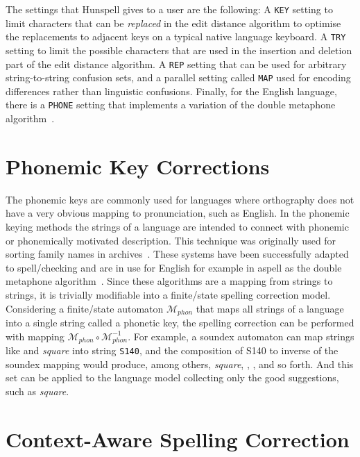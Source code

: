 \documentclass[officiallayout,final]{unihelcompling}
\newcommand\misspelt{\bgroup\markoverwith
{\textcolor{red}{\lower3.5pt\hbox{\sixly \char58}}}\ULon}
\begin{document}
The settings that Hunspell gives to a user are the following: A \texttt{KEY}
setting to limit characters that can be \emph{replaced} in the edit distance
algorithm to optimise the replacements to adjacent keys on a typical native
language keyboard. A \texttt{TRY} setting to limit the possible characters
that are used in the insertion and deletion part of the edit distance
algorithm. A \texttt{REP} setting that can be used for arbitrary
string-to-string confusion sets, and a parallel setting called \texttt{MAP}
used for encoding differences rather than linguistic confusions.  Finally, for
the English language, there is a \texttt{PHONE} setting that implements a
variation of the double metaphone algorithm~\citep{philips2000double}.

\section{Phonemic Key Corrections}
\label{sec:phonemic}

The phonemic keys are commonly used for languages where orthography does not
have a very obvious mapping to pronunciation, such as English. In the phonemic
keying methods the strings of a language are intended to connect with phonemic
or phonemically motivated description. This technique was originally used for
sorting family names in archives~\citep{russell1918soundex}. These systems have
been successfully adapted to spell\-/checking and are in use for English for
example in aspell as the double metaphone algorithm~\citep{philips2000double}.
Since these algorithms are a mapping from strings to strings, it is trivially
modifiable into a finite\-/state spelling correction model. Considering a
finite\-/state automaton $\mathcal{M}_{phon}$ that maps all strings of a
language into a single string called a phonetic key, the spelling correction
can be performed with mapping $\mathcal{M}_{phon} \circ
\mathcal{M}_{phon}^{-1}$.  For example, a soundex automaton can map strings
like \misspelt{squer} and \emph{square} into string \texttt{S140}, and the
composition of S140 to inverse of the soundex mapping would produce, among
others, \emph{square}, \misspelt{squer}, \misspelt{sqr}, \misspelt{sqrrr} and
so forth. And this set can be applied to the language model collecting only the
good suggestions, such as \emph{square}.

\section{Context-Aware Spelling Correction}
\label{sec:context}
\end{document}
